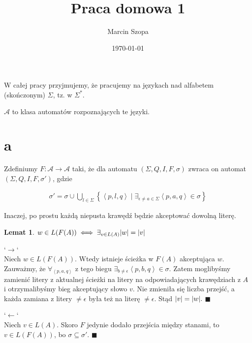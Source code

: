 \documentclass{article}
\title{Praca domowa 1}
\author{Marcin Szopa}
\date{\today}
\newtheorem{lemma}[theorem]{Lemat}
\theoremstyle{definition}
\theoremstyle{remark}
\begin{document}
\maketitle

W całej pracy przyjmujemy, że pracujemy na językach nad alfabetem (skończonym) \(\Sigma\), tz. w \( \Sigma^* \).

\(\mathcal{A}\) to klasa automatów rozpoznających te języki.

\section{a}

Zdefiniumy \(F: \mathcal{A} \to \mathcal{A}\) taki,
że dla automatu \(\left(\Sigma, Q, I, F, \sigma\right)\) zwraca on automat \(\left(\Sigma, Q, I, F, \sigma'\right)\), gdzie

\begin{align*}
\sigma' = \sigma \cup \bigcup_{l \in \Sigma} \left\{ \left< p, l, q \right> \mid \exists_{\epsilon \neq a \in \Sigma}{\left< p, a, q \right> \in \sigma} \right\}
\end{align*}

Inaczej, po prostu każdą niepusta krawędź będzie akceptować dowolną literę.

\begin{lemma}
    \(w \in L(F(A)) \iff \exists_{v \in L(A)} \abs{w}=\abs{v}\)
\end{lemma}

`\(\rightarrow\)` \\
Niech \(w \in L(F(A))\). Wtedy istnieje ścieżka w \(F(A)\) akceptująca \(w\). Zauważmy, że \(\forall_{\left< p, a, q \right>}\) z tego biegu \( \exists_{b \neq \epsilon} \left< p, b, q \right> \in \sigma\). Zatem moglibyśmy zamienić litery z aktualnej ścieżki na litery na odpowiadających krawędziach z \(A\) i otrzymalibyśmy bieg akceptujący słowo \(v\). Nie zmieniła się liczba przejść, a każda zamiana z litery \(\neq \epsilon\) była też na literę \(\neq \epsilon\). Stąd \(\abs{v}=\abs{w}.\) \(\blacksquare\)

`\(\leftarrow\)` \\
Niech \(v \in L(A)\). Skoro \(F\) jedynie dodało przejścia między stanami, to \(v \in L(F(A))\), bo \(\sigma \subseteq \sigma'\). \(\blacksquare\)
\end{document}
